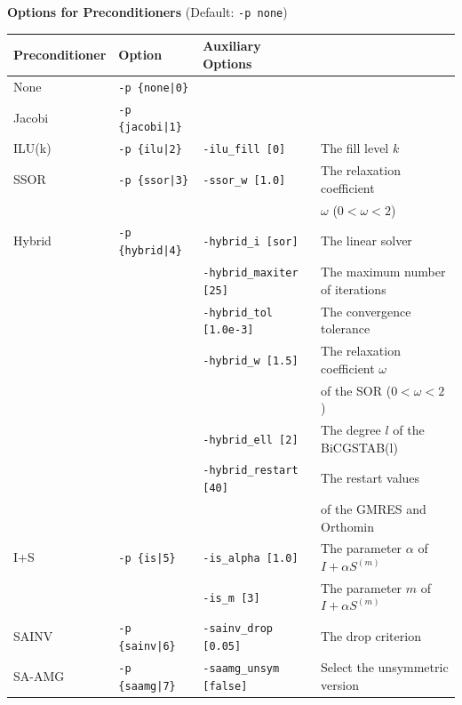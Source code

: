 \documentclass[a4paper]{article}
\begin{document}
\\ \\
\begin{minipage}[t]{\textwidth}
\begin{center}
{\bf Options for Preconditioners} (Default: \verb=-p none=)\\
\begin{tabular}{l|lll}\hline\hline
Preconditioner   & Option           & Auxiliary Options \\ \hline
None     & \verb=-p {none|0}=    &   \\
Jacobi   & \verb=-p {jacobi|1}=  &     \\
ILU(k)   & \verb=-p {ilu|2}=     & \verb=-ilu_fill [0]=        & The fill level $k$ \\
SSOR     & \verb=-p {ssor|3}=    & \verb=-ssor_w [1.0]=        & The relaxation coefficient \\ 
         &                       &                             & $\omega$ ($0<\omega<2$) \\
Hybrid   & \verb=-p {hybrid|4}=  & \verb=-hybrid_i [sor]=      & The linear solver\\
         &                       & \verb=-hybrid_maxiter [25]= & The maximum number of iterations \\
         &                       & \verb=-hybrid_tol [1.0e-3]= & The convergence tolerance \\
         &                       & \verb=-hybrid_w [1.5]=      & The relaxation coefficient $\omega$ \\
         &                       &                             & of the SOR ($0<\omega<2$) \\
         &                       & \verb=-hybrid_ell [2]=      & The degree $l$ of the BiCGSTAB(l) \\
         &                       & \verb=-hybrid_restart [40]= & The restart values \\
         &                       &                             & of the GMRES and Orthomin \\
I+S      & \verb=-p {is|5}=      & \verb=-is_alpha [1.0]=      & The parameter $\alpha$ of $I+\alpha S^{(m)}$ \\
         &                       & \verb=-is_m [3]=            & The parameter $m$ of $I+\alpha S^{(m)}$ \\
SAINV    & \verb=-p {sainv|6}=   & \verb=-sainv_drop [0.05]=   & The drop criterion\\
SA-AMG   & \verb=-p {saamg|7}=   & \verb=-saamg_unsym [false]= & Select the unsymmetric version    \\

\end{tabular}
\end{center}
\end{minipage}
\end{document}
